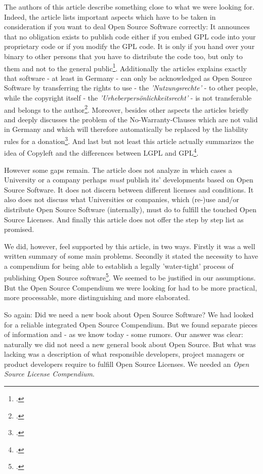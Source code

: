 The authors of this article describe something close to what we were looking
for. Indeed, the article lists important aspects which have to be taken in
consideration if you want to deal Open Source Software correctly: It announces
that no obligation exists to publish code either if you embed GPL code into your
proprietary code or if you modify the GPL code. It is only if you hand over your
binary to other persons that you have to distribute the code too, but only to
them and not to the general public\footcite[cf.][170 and 181]{BreGlaGra2008a}.
Additionally the articles explains exactly that software - at least in Germany -
can only be acknowledged as Open Source Software by transferring the rights to
use - the \emph{'Nutzungsrechte'} - to other people, while the copyright itself
- the \emph{'Urheberpersönlichkeitsrecht'} - is not transferable and belongs to
the author\footcite[cf.][173]{BreGlaGra2008a}. Moreover, besides other aspects
the articles briefly and deeply discusses the problem of the No-Warranty-Clauses
which are not valid in Germany and which will therefore automatically be
replaced by the liability rules for a
donation\footcite[cf.][177]{BreGlaGra2008a}. And last but not least this article
actually summarizes the idea of Copyleft and the differences between LGPL and
GPL\footcite[cf.][181]{BreGlaGra2008a}.

However some gaps remain. The article does not analyze in which cases a
University or a company perhaps \emph{must} publish its' developments based
on Open Source Software. It does not discern between different licenses
and conditions. It also does not discuss what Universities or companies,
which (re-)use and/or distribute Open Source Software (internally), must do to
fulfill the touched Open Source Licenses. And finally this article
does not offer the step by step list as promised.

We did, however, feel supported by this article, in two ways. Firstly it was a
well written summary of some main problems. Secondly it stated the necessity to
have a compendium for being able to establish a legally 'water-tight' process of
publishing Open Source software\footcite[cf.][186]{BreGlaGra2008a}. We
seemed to be justified in our assumptions. But the Open Source Compendium we
were looking for had to be more practical, more processable, more distinguishing
and more elaborated.

So again: Did we need a new book about Open Source Software? We had looked for a
reliable integrated Open Source Compendium. But we found separate pieces of
information and - as we know today - some rumors. Our answer was clear:
naturally we did not need a new general book about Open Source. But what was
lacking was a description of what responsible developers, project managers or
product developers require to fulfill Open Source Licenses. We needed an
\textit{Open Source License Compendium}.

